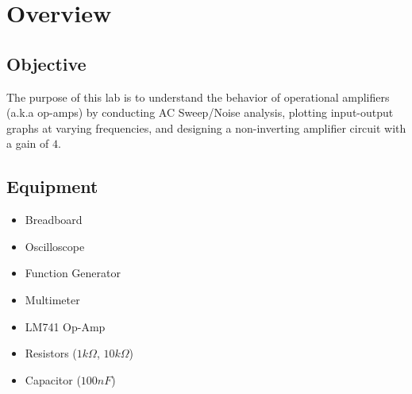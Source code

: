 \chapter{Overview}

\section{Objective}
The purpose of this lab is to understand the behavior of operational amplifiers (a.k.a op-amps) by conducting AC Sweep/Noise analysis, plotting input-output graphs at varying frequencies, and designing a non-inverting amplifier circuit with a gain of $4$. 

\section{Equipment}
\begin{itemize}
    \item Breadboard
    \item Oscilloscope
    \item Function Generator
    \item Multimeter
    \item LM741 Op-Amp
    \item Resistors ($1k\Omega$, $10k\Omega$)
    \item Capacitor ($100nF$)
\end{itemize}
